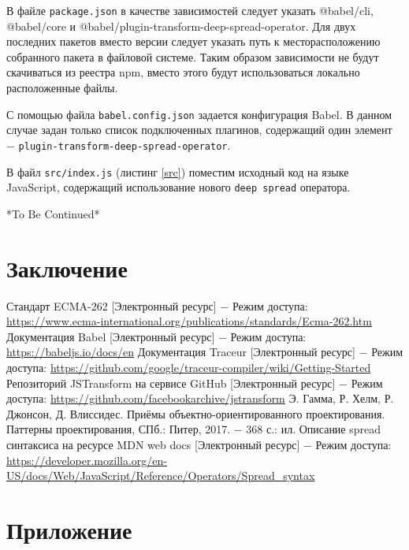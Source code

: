 \documentclass[14pt, a4paper]{article}
\def\code#1{\texttt{#1}} %
\begin{document}
В файле \code{package.json} в качестве зависимостей следует указать @babel/cli, @babel/core и 
@babel/plugin-transform-deep-spread-operator. Для двух последних пакетов вместо версии 
следует указать путь к месторасположению собранного пакета в файловой системе. Таким образом 
зависимости не будут скачиваться из реестра npm, вместо этого будут использоваться локально расположенные 
файлы.



С помощью файла \code{babel.config.json} задается конфигурация Babel. В данном случае задан только 
список подключенных плагинов, содержащий один элемент $-$ \code{plugin-transform-deep-spread-operator}.




В файл \code{src/index.js} (листинг \ref{src}) поместим исходный код на языке JavaScript, содержащий 
использование нового \code{deep spread} оператора.






*To Be Continued*

\pagebreak
\section{Заключение}
\pagebreak

\begin{thebibliography}{9}
   Стандарт ECMA-262 [Электронный ресурс] $-$ Режим доступа: \linebreak
    \url{https://www.ecma-international.org/publications/standards/Ecma-262.htm}
   Документация Babel [Электронный ресурс] $-$ Режим доступа: \linebreak
    \url{https://babeljs.io/docs/en}
   Документация Traceur [Электронный ресурс] $-$ Режим доступа: \linebreak
    \url{https://github.com/google/traceur-compiler/wiki/Getting-Started}
   Репозиторий JSTransform на сервисе GitHub [Электронный ресурс] $-$ Режим доступа:
    \url{https://github.com/facebookarchive/jstransform}
   Э. Гамма, Р. Хелм, Р. Джонсон, Д. Влиссидес. Приёмы объектно-ориентированного проектирования. Паттерны проектирования, СПб.: Питер, 2017. $-$ 368 с.: ил.
   Описание spread синтаксиса на ресурсе MDN web docs [Электронный ресурс] $-$ Режим доступа:
    \url{https://developer.mozilla.org/en-US/docs/Web/JavaScript/Reference/Operators/Spread_syntax}
\end{thebibliography}

\pagebreak
{}
\section*{Приложение}

\end{document}
